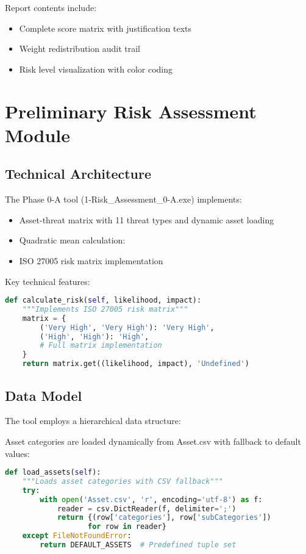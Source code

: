\documentclass[binding=0.6cm]{sapthesis}
\begin{document}
Report contents include:
\begin{itemize}
    \item Complete score matrix with justification texts
    \item Weight redistribution audit trail
    \item Risk level visualization with color coding
\end{itemize}

\section{Preliminary Risk Assessment Module}
\label{sec:phase0a_tool}

\subsection{Technical Architecture}

The Phase 0-A tool (1-Risk\_Assessment\_0-A.exe) implements:

\begin{itemize}
    \item Asset-threat matrix with 11 threat types and dynamic asset loading
    \item Quadratic mean calculation:
    \item ISO 27005 risk matrix implementation
\end{itemize}

Key technical features:

\begin{lstlisting}[language=Python, caption=Risk Calculation Core]
def calculate_risk(self, likelihood, impact):
    """Implements ISO 27005 risk matrix"""
    matrix = {
        ('Very High', 'Very High'): 'Very High',
        ('High', 'High'): 'High',
        # Full matrix implementation
    }
    return matrix.get((likelihood, impact), 'Undefined')
\end{lstlisting}

\subsection{Data Model}

The tool employs a hierarchical data structure:

Asset categories are loaded dynamically from Asset.csv with fallback to default values:

\begin{lstlisting}[language=Python, caption=Asset Loading Logic]
def load_assets(self):
    """Loads asset categories with CSV fallback"""
    try:
        with open('Asset.csv', 'r', encoding='utf-8') as f:
            reader = csv.DictReader(f, delimiter=';')
            return {(row['categories'], row['subCategories']) 
                   for row in reader}
    except FileNotFoundError:
        return DEFAULT_ASSETS  # Predefined tuple set
\end{lstlisting}
\end{document}
